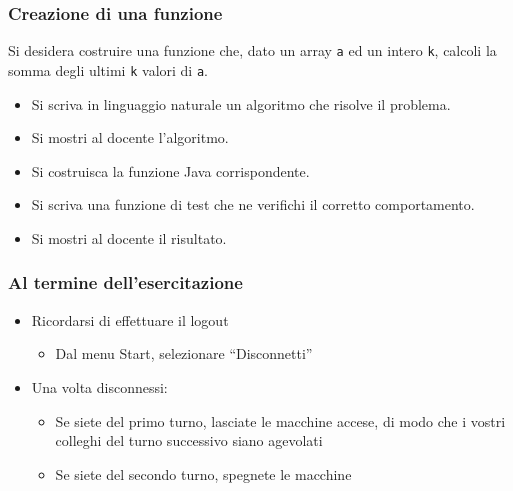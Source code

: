 \documentclass{beamer}
\begin{document}
\begin{frame}[fragile]
\frametitle{Creazione di una funzione}
Si desidera costruire una funzione che, dato un array \texttt{a} ed un intero \texttt{k}, calcoli la somma degli ultimi \texttt{k} valori di \texttt{a}.
\begin{itemize}
 \item Si scriva in linguaggio naturale un algoritmo che risolve il problema.
 \item Si mostri al docente l'algoritmo.
 \item Si costruisca la funzione Java corrispondente.
 \item Si scriva una funzione di test che ne verifichi il corretto comportamento.
 \item Si mostri al docente il risultato.
\end{itemize}
\end{frame}

\begin{frame}
\frametitle{Al termine dell'esercitazione}
\begin{itemize}
 \item Ricordarsi di effettuare il logout
  \begin{itemize}
    \item Dal menu Start, selezionare ``Disconnetti''
  \end{itemize}
 \item Una volta disconnessi:
  \begin{itemize}
    \item Se siete del primo turno, lasciate le macchine accese, di modo che i vostri colleghi del turno successivo siano agevolati
    \item Se siete del secondo turno, spegnete le macchine
  \end{itemize}
\end{itemize}
\end{frame}
\end{document}
